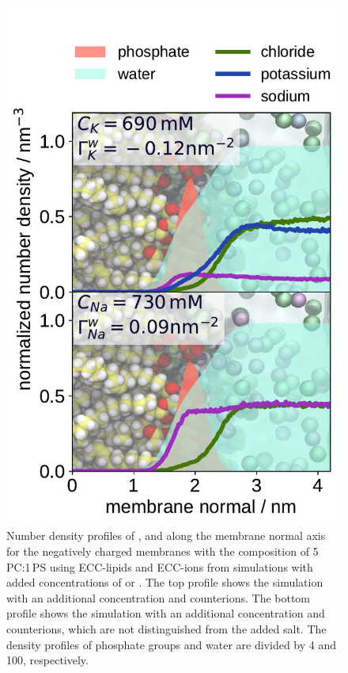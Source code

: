 \documentclass[journal=jpcbfk,manuscript=article]{achemso}
\newlength{\figwidth}
\begin{document}
\begin{figure}[tbp!] 
  \centering 
  \includegraphics[width=\figwidth]{../img/ecc_pops/density_profiles_na_k_cl_wat_phos_models-compar_5-6_NaCl-and-KCl-series.pdf}
  \caption{\label{fig:nacl-dens_PCPS} 
    Number density profiles of ,  and  along the membrane normal axis 
    for the negatively charged membranes with the composition of 5\,PC:1\,PS using ECC-lipids and ECC-ions
    from simulations with added concentrations of  or .  
    The top    profile shows the simulation with an additional  concentration and  counterions. 
    The bottom profile shows the simulation with an additional  concentration and  counterions, which are not distinguished from the added salt. 
    The density profiles of phosphate groups and water are divided by 4 and 100, respectively.  
  }
\end{figure} 
\end{document}
